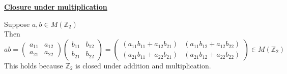 \documentclass{article} %
\begin{document}
\begin{addmargin}[1em]{0em}
\underline{\textbf{Closure under multiplication}}
\begin{addmargin}[1em]{0em}
Suppose $a, b \in M(\mathbb{Z}_2)$
\\Then $ab = \left( \begin{smallmatrix} a_{11} & a_{12} \\ a_{21} & a_{22} \end{smallmatrix} \right) \left( \begin{smallmatrix} b_{11} & b_{12} \\ b_{21} & b_{22} \end{smallmatrix} \right) = \left( \begin{smallmatrix} (a_{11}b_{11} + a_{12}b_{21}) & (a_{11}b_{12} + a_{12}b_{22} ) \\ (a_{21}b_{11} + a_{22}b_{21}) & (a_{21}b_{12} + a_{22}b_{22}) \end{smallmatrix} \right) \in M(\mathbb{Z}_2)$
\\This holds because $\mathbb{Z}_2$ is closed under addition and multiplication.
\end{addmargin}


\end{addmargin}
\end{document}
